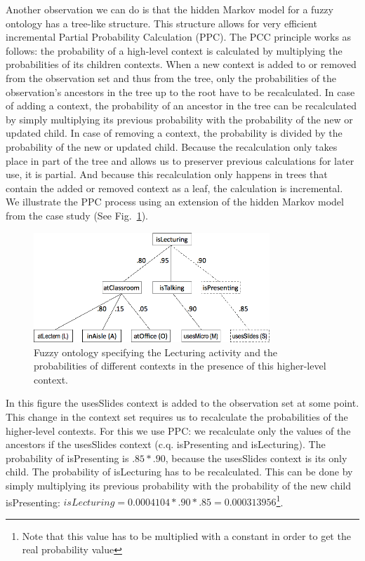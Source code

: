 \documentclass[journal]{vgtc}                %
\begin{document}
Another observation we can do is that the hidden Markov model for a fuzzy ontology has a tree-like structure. This structure allows for very efficient incremental Partial Probability Calculation (PPC). The PCC principle works as follows: the probability of a high-level context is calculated by multiplying the probabilities of its children contexts. When a new context is added to or removed from the observation set and thus from the tree, only the probabilities of the observation's ancestors in the tree up to the root have to be recalculated. In case of adding a context, the probability of an ancestor in the tree can be recalculated by simply multiplying its previous probability with the probability of the new or updated child. In case of removing a context, the probability is divided by the probability of the new or updated child. Because the recalculation only takes place in part of the tree and allows us to preserver previous calculations for later use, it is partial. And because this recalculation only happens in trees that contain the added or removed context as a leaf, the calculation is incremental. We illustrate the PPC process using an extension of the hidden Markov model from the case study (See Fig.~\ref{fig:fuzzy2}). 
\begin{figure}[htb]
  \centering
  \includegraphics[width=3.5in]{fuzzy2}
  \caption{Fuzzy ontology specifying the Lecturing activity and the probabilities of different contexts in the presence of this higher-level context.}
  \label{fig:fuzzy2}
\end{figure}
In this figure the usesSlides context is added to the observation set at some point. This change in the context set requires us to recalculate the probabilities of the higher-level contexts. For this we use PPC: we recalculate only the values of the ancestors if the usesSlides context (c.q. isPresenting and isLecturing). The probability of isPresenting is $.85 * .90$, because the usesSlides context is its only child. The probability of isLecturing has to be recalculated. This can be done by simply multiplying its previous probability with the probability of the new child isPresenting: $isLecturing = 0.0004104 * .90 * .85 = 0.000313956$\footnote{Note that this value has to be multiplied with a constant in order to get the real probability value}.
\end{document}
